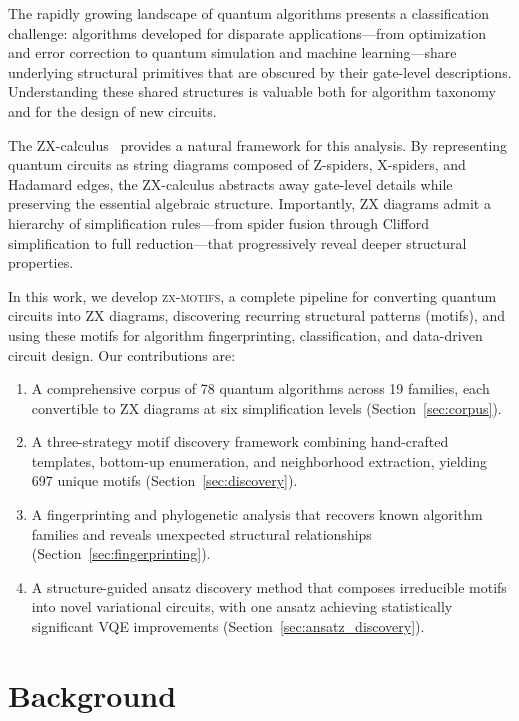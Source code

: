 \documentclass[twocolumn,prl,amsmath,amssymb,superscriptaddress]{revtex4-2}
\newcommand{\zxmotifs}{\textsc{zx-motifs}}
\begin{document}
The rapidly growing landscape of quantum algorithms presents a classification challenge: algorithms developed for disparate applications---from optimization and error correction to quantum simulation and machine learning---share underlying structural primitives that are obscured by their gate-level descriptions.
Understanding these shared structures is valuable both for algorithm taxonomy and for the design of new circuits.

The ZX-calculus~\cite{Coecke2011,vandeWetering2020} provides a natural framework for this analysis.
By representing quantum circuits as string diagrams composed of Z-spiders, X-spiders, and Hadamard edges, the ZX-calculus abstracts away gate-level details while preserving the essential algebraic structure.
Importantly, ZX diagrams admit a hierarchy of simplification rules---from spider fusion through Clifford simplification to full reduction---that progressively reveal deeper structural properties.

In this work, we develop \zxmotifs{}, a complete pipeline for converting quantum circuits into ZX diagrams, discovering recurring structural patterns (motifs), and using these motifs for algorithm fingerprinting, classification, and data-driven circuit design.
Our contributions are:

\begin{enumerate}
    \item A comprehensive corpus of 78 quantum algorithms across 19 families, each convertible to ZX diagrams at six simplification levels (Section~\ref{sec:corpus}).
    \item A three-strategy motif discovery framework combining hand-crafted templates, bottom-up enumeration, and neighborhood extraction, yielding 697 unique motifs (Section~\ref{sec:discovery}).
    \item A fingerprinting and phylogenetic analysis that recovers known algorithm families and reveals unexpected structural relationships (Section~\ref{sec:fingerprinting}).
    \item A structure-guided ansatz discovery method that composes irreducible motifs into novel variational circuits, with one ansatz achieving statistically significant VQE improvements (Section~\ref{sec:ansatz_discovery}).
\end{enumerate}

\section{Background}
\label{sec:background}
\end{document}
